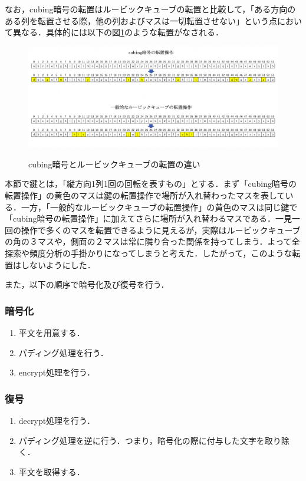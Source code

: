 \documentclass[a4j,titlepage]{jsarticle}
\begin{document}
なお，cubing暗号の転置はルービックキューブの転置と比較して，「ある方向のある列を転置させる際，他の列およびマスは一切転置させない」という点において異なる．具体的には以下の図\ref{fig:trans-diff}のような転置がなされる．
\begin{figure}[htb]
  \includegraphics[width=12cm]{./tex_pic/trans.png}\\
  \caption{cubing暗号とルービックキューブの転置の違い}
  \label{fig:trans-diff}
\end{figure}
本節で鍵とは，「縦方向1列1回の回転を表すもの」とする．まず「cubing暗号の転置操作」の黄色のマスは鍵の転置操作で場所が入れ替わったマスを表している．一方，「一般的なルービックキューブの転置操作」の黄色のマスは同じ鍵で「cubing暗号の転置操作」に加えてさらに場所が入れ替わるマスである．一見一回の操作で多くのマスを転置できるように見えるが，実際はルービックキューブの角の３マスや，側面の２マスは常に隣り合った関係を持ってしまう．よって全探索や頻度分析の手掛かりになってしまうと考えた．したがって，このような転置はしないようにした．

また，以下の順序で暗号化及び復号を行う．
\subsubsection{暗号化}
\begin{screen}
  \begin{enumerate}
    \item 平文を用意する．
    \item パディング処理を行う．
    \item encrypt処理を行う．
  \end{enumerate}
\end{screen}

\subsubsection{復号}
\begin{screen}
  \begin{enumerate}
    \item decrypt処理を行う．
    \item パディング処理を逆に行う．つまり，暗号化の際に付与した文字を取り除く．
    \item 平文を取得する．
  \end{enumerate}
\end{screen}
\end{document}
